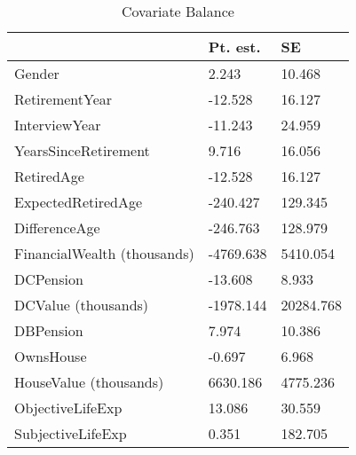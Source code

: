 \begin{table}

\caption{Covariate Balance \label{tab:cov_balance}}
\centering
\begin{tabular}[t]{lll}
\toprule
 & Pt. est. & SE\\
\midrule
Gender & 2.243 & 10.468\\
RetirementYear & -12.528 & 16.127\\
InterviewYear & -11.243 & 24.959\\
YearsSinceRetirement & 9.716 & 16.056\\
RetiredAge & -12.528 & 16.127\\
\addlinespace
ExpectedRetiredAge & -240.427 & 129.345\\
DifferenceAge & -246.763 & 128.979\\
FinancialWealth (thousands) & -4769.638 & 5410.054\\
DCPension & -13.608 & 8.933\\
DCValue (thousands) & -1978.144 & 20284.768\\
\addlinespace
DBPension & 7.974 & 10.386\\
OwnsHouse & -0.697 & 6.968\\
HouseValue (thousands) & 6630.186 & 4775.236\\
ObjectiveLifeExp & 13.086 & 30.559\\
SubjectiveLifeExp & 0.351 & 182.705\\
\bottomrule
\end{tabular}
\end{table}
